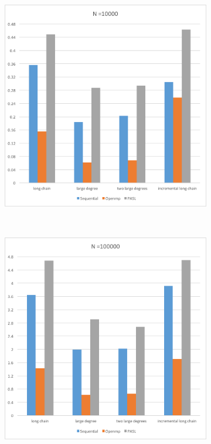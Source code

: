 \documentclass[specification,annotation,times]{itmo-student-thesis}
\begin{document}
\begin{figure}[!ht]
\centering
\begin{subfigure}[b]{0.45\textwidth}
    \includegraphics[width=\textwidth]{pic/results-4-a.png}
\end{subfigure}~~\begin{subfigure}[b]{0.45\textwidth}
    \includegraphics[width=\textwidth]{pic/results-4-b.png}

\end{subfigure}
\end{figure}
\end{document}
